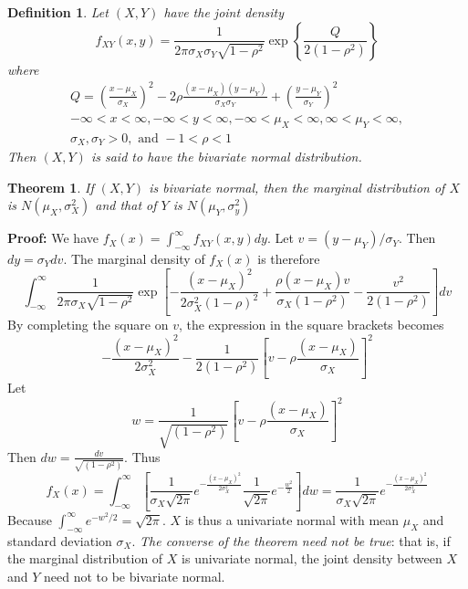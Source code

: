 \documentclass{article}
\newtheorem{definition}{Definition}[section]
\newtheorem{theorem}{Theorem}[section]
\begin{document}
\begin{definition}
    Let \((X,Y)\) have the joint density
    \begin{equation*}
        f_{XY}(x,y)=\frac{1}{2 \pi \sigma_X \sigma_Y \sqrt{1-\rho^2}} \exp\left\{\frac{Q}{2(1-\rho^2)}\right\}
    \end{equation*}
    where 
    \begin{equation*}
    \begin{split}
        Q=\left(\frac{x-\mu_X}{\sigma_X}\right)^2-2\rho\frac{(x-\mu_X)(y-\mu_Y)}{\sigma_X\sigma_Y}+\left(\frac{y-\mu_Y}{\sigma_Y}\right)^2 \\
        -\infty<x<\infty,-\infty<y<\infty,-\infty<\mu_X<\infty,\infty<\mu_Y<\infty, \\
        \sigma_X,\sigma_Y>0, \text{ and } -1<\rho<1
    \end{split}
    \end{equation*}
    Then \((X,Y)\) is said to have the bivariate normal distribution.
\end{definition}

\begin{theorem}
    If \((X,Y)\) is bivariate normal, then the marginal distribution of \(X\) is \(N(\mu_X,\sigma_X^2)\) and that of \(Y\) is \(N(\mu_Y,\sigma_y^2)\)
\end{theorem}

\textbf{Proof:} We have \(f_X(x)=\int_{-\infty}^{\infty}f_{XY}(x,y)dy\). Let \(v=(y-\mu_Y)/\sigma_Y\). Then \(dy=\sigma_Y dv\). The marginal density of \(f_X(x)\) is therefore
\begin{equation*}
    \int_{-\infty}^{\infty} \frac{1}{2 \pi \sigma_X \sqrt{1-\rho^2}} \exp{\left[-\frac{(x-\mu_X)^2}{2\sigma_X^2(1-\rho)^2}+\frac{\rho(x-\mu_X)v}{\sigma_X(1-\rho^2)}-\frac{v^2}{2(1-\rho^2)} \right] dv}
\end{equation*}
By completing the square on \(v\), the expression in the square brackets becomes
\begin{equation*}
    -\frac{(x-\mu_X)^2}{2\sigma_X^2}-\frac{1}{2(1-\rho^2)}\left[v-\rho \frac{(x-\mu_X)}{\sigma_X} \right]^2
\end{equation*}
Let 
\begin{equation*}
    w=\frac{1}{\sqrt{(1-\rho^2)}}  \left[v-\rho \frac{(x-\mu_X)}{\sigma_X} \right]^2
\end{equation*}
Then \(dw=\frac{dv}{\sqrt{(1-\rho^2)}}\). Thus
\begin{equation*}
    f_X(x)= \int_{-\infty}^{\infty} \left[\frac{1}{\sigma_X\sqrt{2\pi}} e^{-\frac{(x-\mu_X)^2}{2 \sigma_X^2}} \frac{1}{\sqrt{2\pi}} e^{-\frac{w^2}{2}}\right]dw=\frac{1}{\sigma_X \sqrt{2\pi}} e^{-\frac{(x-\mu_X)^2}{2 \sigma_X^2}}
\end{equation*}
Because \(\int_{-\infty}^{\infty} e^{-w^2/2}=\sqrt{2\pi}\). \(X\) is thus a univariate normal with mean \(\mu_X\) and standard deviation \(\sigma_X\). \textit{The converse of the theorem need not be true}: that is, if the marginal distribution of \(X\) is univariate normal, the joint density between \(X\) and \(Y\) need not to be bivariate normal.
\end{document}
